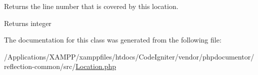 Returns the line number that is covered by this location.

\begin{DoxyReturn}{Returns}
integer 
\end{DoxyReturn}


The documentation for this class was generated from the following file\+:\begin{DoxyCompactItemize}
\item 
/\+Applications/\+X\+A\+M\+P\+P/xamppfiles/htdocs/\+Code\+Igniter/vendor/phpdocumentor/reflection-\/common/src/\mbox{\hyperlink{_location_8php}{Location.\+php}}\end{DoxyCompactItemize}
